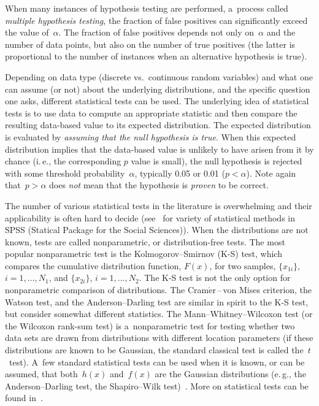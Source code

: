 \begin{multicols}{2}
  When many instances of hypothesis testing are performed, a~process called
\textit{multiple hypothesis testing}, the fraction of false positives can significantly
exceed the value of~$\alpha$. The fraction of false positives depends not only
on~$\alpha$ and the number of data points, but also on the number of true positives
(the latter is proportional to the number of instances when an alternative hypothesis is
true).

  Depending on data type (discrete vs.\ continuous random variables) and what one
can assume (or not) about the underlying distributions, and the specific question
one asks, different statistical tests can be used. The underlying idea of statistical tests is to
use data to compute an appropriate statistic and then compare the resulting
  data-based value to its expected distribution. The expected distribution is evaluated
by \textit{assuming that the null hypothesis is true}. When this expected distribution
implies that the data-based value is unlikely to have arisen from it by chance (i.\,e.,
the corresponding $p$ value is small), the null hypothesis is rejected with some
threshold probability~$\alpha$, typically 0.05 or 0.01 ($p<\alpha$). Note again
that~$p>\alpha$ does \textit{not} mean that the hypothesis is \textit{proven} to be
correct.

  The number of various statistical tests in the literature is overwhelming and their
applicability is often hard to decide (see~\cite{29-kl, 30-kl} for variety of statistical
methods in SPSS (Statical Package for the Social Sciences)).
When the distributions are not known, tests are called
nonparametric, or distribution-free tests. The most popular nonparametric test is the
Kolmogorov--Smirnov (K-S) test, which compares the cumulative distribution
function, $F (x)$, for two samples, $\{x_{1i}\}$, $i = 1,\ldots  , N_1$, and $\{x_{2i}\}$,
$i = 1,\ldots  , N_2$. The K-S test is not the only option for nonparametric comparison
of distributions. The Cram$\acute{\mbox{e}}$r\,--\,von Mises criterion, the Watson
test, and the Anderson--Darling test are similar in spirit to the K-S test, but consider
somewhat different statistics. The Mann--Whitney--Wilcoxon test (or the Wilcoxon
rank-sum test) is a~nonparametric test for testing whether two data sets are drawn
from distributions with different location parameters (if these distributions are known
to be Gaussian, the standard classical test is called the~$t$~test). A~few standard
statistical tests can be used when it is known, or can be assumed, that both~$h(x)$ and~$f(x)$
are the Gaussian distributions (e.\,g., the Anderson--Darling test, the Shapiro--Wilk
test)~\cite{27-kl}. More on statistical tests can be found
in~\cite{27-kl, 29-kl, 30-kl, 31-kl}.


\end{multicols}
